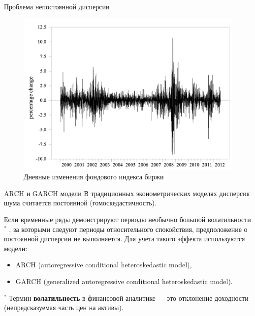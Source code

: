 \begin{frame}{Проблема непостоянной дисперсии}
\begin{figure}
    \centering
    \includegraphics[width=0.9\linewidth]{lecture_3/fig/index_USA.png}
    \caption{Дневные изменения фондового индекса биржи}
\end{figure}
\end{frame}
\begin{frame}{ARCH и GARCH модели}
В традиционных эконометрических моделях дисперсия шума считается постоянной (гомоскедастичность).

Если временные ряды демонстрируют периоды необычно большой волатильности$^*$ , за которыми следуют периоды относительного спокойствия, предположение о постоянной дисперсии не выполняется. Для учета такого эффекта используются модели:
\begin{itemize}
    \item ARCH (autoregressive conditional heteroskedastic model),
    \item GARCH (generalized autoregressive conditional heteroskedastic
model).
\end{itemize}
\vspace{0.5cm}
$^*$ Термин \textbf{волатильность} в финансовой аналитике --- это отклонение доходности (непредсказуемая часть цен на активы).

\end{frame}



